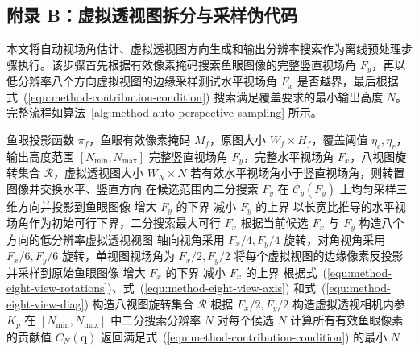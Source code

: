{    \FloatBarrier
    \subsection*{附录 B：虚拟透视图拆分与采样伪代码}
    \label{app:virtual-perspective}

    本文将自动视场角估计、虚拟透视图方向生成和输出分辨率搜索作为离线预处理步骤执行。该步骤首先根据有效像素掩码搜索鱼眼图像的完整竖直视场角 \(F_y\)，再以低分辨率八个方向虚拟视图的边缘采样测试水平视场角 \(F_x\) 是否越界，最后根据式~(\ref{equ:method-contribution-condition}) 搜索满足覆盖要求的最小输出高度 \(N\)。完整流程如算法~\ref{alg:method-auto-perspective-sampling} 所示。

    \begin{algorithm}[!htbp]
        \caption{自动确定鱼眼虚拟透视图拆分方案}
        \label{alg:method-auto-perspective-sampling}
        \begin{algorithmic}[1]
            \REQUIRE 鱼眼投影函数 \(\pi_f\)，鱼眼有效像素掩码 \(M_f\)，原图大小 \(W_f\times H_f\)，覆盖阈值 \(\eta_c,\eta_r\)，输出高度范围 \([N_{\min},N_{\max}]\)
            \ENSURE 完整竖直视场角 \(F_y\)，完整水平视场角 \(F_x\)，八视图旋转集合 \(\mathcal{R}\)，虚拟透视图大小 \(W_N\times N\)
            \STATE 若有效水平视场角小于竖直视场角，则转置图像并交换水平、竖直方向
            \STATE 在候选范围内二分搜索 \(F_y\)
                \STATE 在 \(\mathcal{C}_y(F_y)\) 上均匀采样三维方向并投影到鱼眼图像
                    \STATE 增大 \(F_y\) 的下界
                \ELSE
                    \STATE 减小 \(F_y\) 的上界
                \ENDIF
            \ENDWHILE
            \STATE 以长宽比推导的水平视场角作为初始可行下界，二分搜索最大可行 \(F_x\)
                \STATE 根据当前候选 \(F_x\) 与 \(F_y\) 构造八个方向的低分辨率虚拟透视视图
                \STATE 轴向视角采用 \(F_x/4,F_y/4\) 旋转，对角视角采用 \(F_x/6,F_y/6\) 旋转，单视图视场角为 \(F_x/2,F_y/2\)
                \STATE 将每个虚拟视图的边缘像素反投影并采样到原始鱼眼图像
                    \STATE 增大 \(F_x\) 的下界
                \ELSE
                    \STATE 减小 \(F_x\) 的上界
                \ENDIF
            \ENDWHILE
            \STATE 根据式~(\ref{equ:method-eight-view-rotations})、式~(\ref{equ:method-eight-view-axis}) 和式~(\ref{equ:method-eight-view-diag}) 构造八视图旋转集合 \(\mathcal{R}\)
            \STATE 根据 \(F_x/2,F_y/2\) 构造虚拟透视相机内参 \(K_p\)
            \STATE 在 \([N_{\min},N_{\max}]\) 中二分搜索分辨率 \(N\)
            \STATE 对每个候选 \(N\) 计算所有有效鱼眼像素的贡献值 \(C_N(\mathbf{q})\)
            \STATE 返回满足式~(\ref{equ:method-contribution-condition}) 的最小 \(N\)
        \end{algorithmic}
    \end{algorithm}

}

